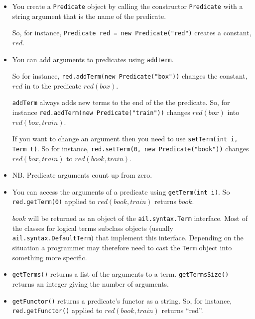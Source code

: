 \documentclass[a4]{article}
\begin{document}
\begin{itemize}
\item You create a \texttt{Predicate} object by calling the constructor \texttt{Predicate} with a string argument that is the name of the predicate.

So, for instance, \texttt{Predicate red = new Predicate("red")} creates a constant, $red$.  
\item You can add arguments to predicates using \texttt{addTerm}.

So for instance, \texttt{red.addTerm(new Predicate("box"))} changes the constant, $red$ in to the predicate $red(box)$.  

\texttt{addTerm} always adds new terms to the end of the the predicate.  So, for instance \texttt{red.addTerm(new Predicate("train"))} changes $red(box)$ into $red(box, train)$.  

If you want to change an argument then you need to use \texttt{setTerm(int i, Term t)}.  So for instance, \texttt{red.setTerm(0, new Predicate("book"))} changes $red(box, train)$ to $red(book, train)$.
\item NB.  Predicate arguments count up from zero.
\item You can access the arguments of a predicate using \texttt{getTerm(int i)}.  So \texttt{red.getTerm(0)} applied to $red(book, train)$ returns $book$.

\begin{sloppypar}
$book$ will be returned as an object of the \texttt{ail.syntax.Term} interface.  Most of the classes for logical terms subclass objects (usually \texttt{ail.syntax.DefaultTerm}) that implement this interface.  Depending on the situation a programmer may therefore need to cast the \texttt{Term} object into something more specific.
\end{sloppypar}
\item \texttt{getTerms()} returns a list of the arguments to a term.  \texttt{getTermsSize()} returns an integer giving the number of arguments.
\item \texttt{getFunctor()} returns a predicate's functor as a string.  So, for instance, \texttt{red.getFunctor()} applied to $red(book, train)$ returns ``red''.
\end{itemize}
\end{document}
